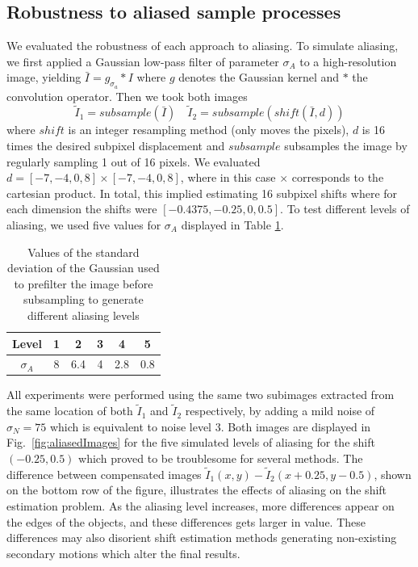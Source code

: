 \subsection{Robustness to aliased sample processes}
We evaluated the robustness of each approach to aliasing. To simulate aliasing, we first applied a Gaussian low-pass filter of parameter $\sigma_A$ to a high-resolution image, yielding $\bar{I} = g_{\sigma_a} * I$ where $g$ denotes the Gaussian kernel and $*$ the convolution operator. Then we took both images
\begin{equation}
\tilde{I}_1	= subsample(\bar{I}) \quad \tilde{I}_2 = subsample(shift(\bar{I},d))
\end{equation}
where $shift$ is an integer resampling method (only moves the pixels), $d$ is 16 times the desired subpixel displacement and $subsample$ subsamples the image by regularly sampling 1 out of 16 pixels.
We evaluated $d = [-7, -4, 0, 8]\times [-7, -4, 0, 8]$, where in this case $\times$ corresponds to the cartesian product. In total, this implied estimating 16 subpixel shifts where for each dimension the shifts were $[-0.4375, -0.25, 0, 0.5]$. To test different levels of aliasing, we used five values for $\sigma_A$ displayed in Table \ref{tab:aliasingLevels}.
\begin{table}[htpb]
\centering
\begin{tabular}{|c|c|c|c|c|c|} 
	\hline
	Level & 1 & 2 & 3 & 4 & 5\\ \hline
	$\sigma_A$ & 8 & 6.4 & 4 & 2.8 & 0.8\\ \hline
\end{tabular}
\caption{Values of the standard deviation of the Gaussian used to prefilter the image before subsampling to generate different aliasing levels}
\label{tab:aliasingLevels}
\end{table}

All experiments were performed using the same two subimages extracted from the same location of both $\tilde{I}_1$ and $\tilde{I}_2$ respectively, by adding a mild noise of $\sigma_N=75$ which is equivalent to noise level 3. Both images are displayed in Fig.~\ref{fig:aliasedImages} for the five simulated levels of aliasing for the shift $(-0.25, 0.5)$ which proved to be troublesome for several methods. The difference between compensated images $\tilde{I}_1(x,y) - \tilde{I}_2(x+0.25, y-0.5)$, shown on the bottom row of the figure, illustrates the effects of aliasing on the shift estimation problem. As the aliasing level increases, more differences appear on the edges of the objects, and these differences gets larger in value. These differences may also disorient shift estimation methods generating non-existing secondary motions which alter the final results. 

